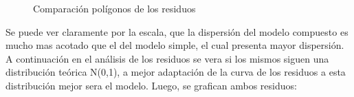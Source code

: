 \begin{figure}[h]
\centering
{}%
\hspace{0.25cm}%
\caption{Comparación polígonos de los residuos}
\label{poligonos_comparativa}
\end{figure}


Se puede ver claramente por la escala, que la dispersión del modelo compuesto es mucho mas acotado que el del modelo simple, el cual presenta mayor dispersión.\\



A continuación en el análisis de los residuos se vera si los mismos siguen una distribución teórica N(0,1), a mejor adaptación de la curva de los residuos a esta distribución mejor sera el modelo.
Luego, se grafican ambos residuos:




